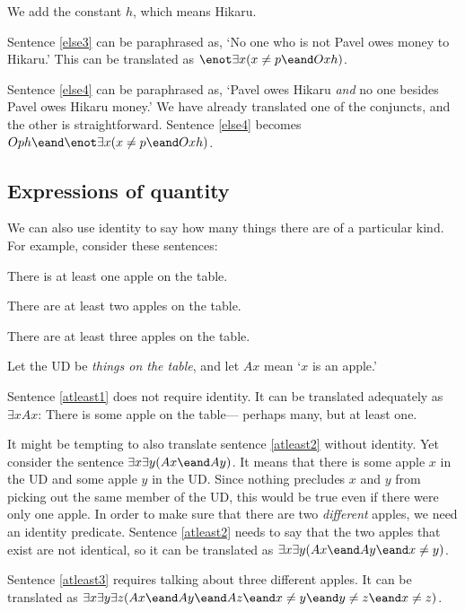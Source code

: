 
We add the constant $h$, which means Hikaru.

Sentence \ref{else3} can be paraphrased as, `No one who is not Pavel owes money to Hikaru.' This can be translated as $\enot\exists x(x\neq p \eand Oxh)$.

Sentence \ref{else4} can be paraphrased as, `Pavel owes Hikaru \emph{and} no one besides Pavel owes Hikaru money.' We have already translated one of the conjuncts, and the other is straightforward. Sentence \ref{else4} becomes $Oph \eand \enot\exists x(x\neq p \eand Oxh)$.


\subsection{Expressions of quantity}
We can also use identity to say how many things there are of a particular kind. For example, consider these sentences:
\begin{earg}
\item[\ex{atleast1}] There is at least one apple on the table.
\item[\ex{atleast2}] There are at least two apples on the table.
\item[\ex{atleast3}] There are at least three apples on the table.
\end{earg}
Let the UD be \emph{things on the table}, and let $Ax$ mean `$x$ is an apple.'

Sentence \ref{atleast1} does not require identity. It can be translated adequately as $\exists x Ax$: There is some apple on the table--- perhaps many, but at least one.

It might be tempting to also translate sentence \ref{atleast2} without identity. Yet consider the sentence $\exists x \exists y(Ax \eand Ay)$. It means that there is some apple $x$ in the UD and some apple $y$ in the UD. Since nothing precludes $x$ and $y$ from picking out the same member of the UD, this would be true even if there were only one apple. In order to make sure that there are two \emph{different} apples, we need an identity predicate. Sentence \ref{atleast2} needs to say that the two apples that exist are not identical, so it can be translated as $\exists x \exists y(Ax \eand Ay \eand x\neq y)$.

Sentence \ref{atleast3} requires talking about three different apples. It can be translated as $\exists x \exists y\exists z(Ax \eand Ay \eand Az \eand x\neq y \eand y\neq z \eand x \neq z)$.

